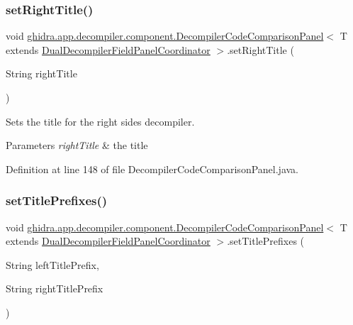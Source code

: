 \subsubsection{\texorpdfstring{setRightTitle()}{setRightTitle()}}
{\footnotesize\ttfamily void \mbox{\hyperlink{classghidra_1_1app_1_1decompiler_1_1component_1_1_decompiler_code_comparison_panel}{ghidra.\+app.\+decompiler.\+component.\+Decompiler\+Code\+Comparison\+Panel}}$<$ T extends \mbox{\hyperlink{classghidra_1_1app_1_1decompiler_1_1component_1_1_dual_decompiler_field_panel_coordinator}{Dual\+Decompiler\+Field\+Panel\+Coordinator}} $>$.set\+Right\+Title (\begin{DoxyParamCaption}\item[{String}]{right\+Title }\end{DoxyParamCaption})\hspace{0.3cm}{\ttfamily [inline]}}

Sets the title for the right side\textquotesingle{}s decompiler. 
\begin{DoxyParams}{Parameters}
{\em right\+Title} & the title \\
\hline
\end{DoxyParams}


Definition at line 148 of file Decompiler\+Code\+Comparison\+Panel.\+java.

\mbox{\label{classghidra_1_1app_1_1decompiler_1_1component_1_1_decompiler_code_comparison_panel_aad06fc89c2bc736c8e06f34a5c164e4b}} 
\subsubsection{\texorpdfstring{setTitlePrefixes()}{setTitlePrefixes()}}
{\footnotesize\ttfamily void \mbox{\hyperlink{classghidra_1_1app_1_1decompiler_1_1component_1_1_decompiler_code_comparison_panel}{ghidra.\+app.\+decompiler.\+component.\+Decompiler\+Code\+Comparison\+Panel}}$<$ T extends \mbox{\hyperlink{classghidra_1_1app_1_1decompiler_1_1component_1_1_dual_decompiler_field_panel_coordinator}{Dual\+Decompiler\+Field\+Panel\+Coordinator}} $>$.set\+Title\+Prefixes (\begin{DoxyParamCaption}\item[{String}]{left\+Title\+Prefix,  }\item[{String}]{right\+Title\+Prefix }\end{DoxyParamCaption})\hspace{0.3cm}{\ttfamily [inline]}}



